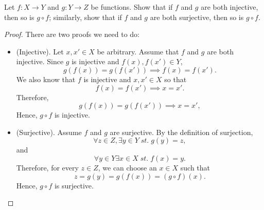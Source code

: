 \begin{exercise}[3.3.2] Let $f:X\to Y$ and $g:Y\to Z$ be functions. Show that if
$f$ and $g$ are both injective, then so is $g\circ f$; similarly, show that if
$f$ and $g$ are both surjective, then so is $g\circ f$.
     \begin{proof} There are two proofs we need to do:
          \begin{itemize}
              \item(Injective). Let $x,x'\in X$ be arbitrary. Assume that $f$ and $g$ are both
              injective. Since $g$ is injective and $f(x),f(x')\in Y$,
              \begin{equation*}
                  g(f(x)) = g(f(x')) \implies f(x)=f(x'). 
              \end{equation*}
              We also know that $f$ is injective and $x,x' \in X$ so that
              \begin{equation*}
                  f(x)=f(x') \implies x=x'.
              \end{equation*}
              Therefore, 
              \begin{equation*}
                  g(f(x))=g(f(x'))\implies x=x',
              \end{equation*}
              Hence, $g\circ f$ is injective.
              \item(Surjective). Assume $f$ and $g$ are surjective. By the
              definition of surjection, 
              \begin{equation*}
                  \forall z\in Z, \exists y\in Y \;st.\; g(y)=z,
              \end{equation*}
              and 
              \begin{equation*}
                  \forall y \in Y \exists x \in X \;st.\; f(x)=y.
              \end{equation*}
              Therefore, for every $z\in Z$, we can choose an $x\in X$ such that
              \begin{equation*}
                  z= g(y) = g(f(x)) = (g\circ f)(x).
              \end{equation*}
              Hence, $g\circ f$ is surjective.
          \end{itemize}
     \end{proof}
\end{exercise}
\pagebreak
